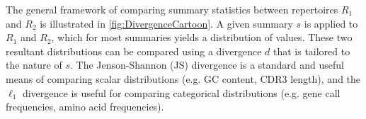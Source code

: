 \documentclass{article}
\begin{document}
The general framework of comparing summary statistics between repertoires $R_1$ and $R_2$ is illustrated in \ref{fig:DivergenceCartoon}.
A given summary $s$ is applied to $R_1$ and $R_2$, which for most summaries yields a distribution of values.
These two resultant distributions can be compared using a divergence $d$ that is tailored to the nature of $s$.
The Jenson-Shannon (JS) divergence is a standard and useful means of comparing scalar distributions (e.g. GC content, CDR3 length), and the $\ell_1$ divergence is useful for comparing categorical distributions (e.g. gene call frequencies, amino acid frequencies).
\end{document}
